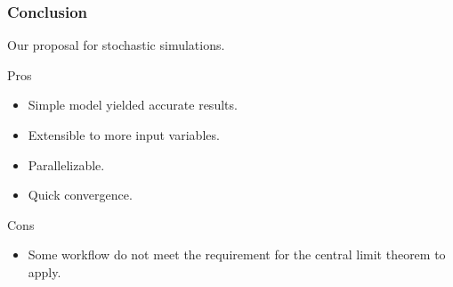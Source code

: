 \documentclass{beamer}
\begin{document}
\begin{frame}
	\frametitle{Conclusion}
	\begin{center}
		Our proposal for stochastic simulations.
	\end{center}
	\begin{exampleblock}{Pros}
	\begin{itemize}
		\item Simple model yielded accurate results.
		\item Extensible to more input variables.
		\item Parallelizable.
		\item Quick convergence.
	\end{itemize}
	\end{exampleblock}
	\begin{alertblock}{Cons}
	\begin{itemize}
		\item Some workflow do not meet the requirement for the central
			limit theorem to apply.
	\end{itemize}
	\end{alertblock}
\end{frame}
\end{document}
